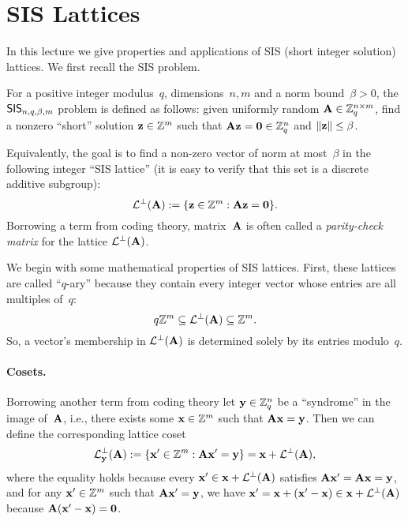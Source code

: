 \documentclass[11pt]{article}
\begin{document}
\thispagestyle{fancy} %


\section{SIS Lattices}
\label{sec:sis-lat}

In this lecture we give properties and applications of SIS (short
integer solution) lattices. We first recall the SIS problem.

\begin{definition}
  \label{def:sis-problem}
  For a positive integer modulus~$q$, dimensions~$n,m$ and a norm
  bound~$\beta > 0$, the $\mathsf{SIS}_{n,q,\beta,m}$ problem is defined as
  follows: given uniformly random $\mathbf{A} \in \mathbb{Z}_q^{n \times m}$, find a
  nonzero ``short'' solution $\mathbf{z} \in \mathbb{Z}^{m}$ such that
  $\mathbf{A} \mathbf{z} = \mathbf{0} \in \mathbb{Z}_q^{n}$ and
  $\lVert\mathbf{z}\rVert \leq \beta$.

  Equivalently, the goal is to find a non-zero vector of norm at
  most~$\beta$ in the following integer ``SIS lattice'' (it is easy to
  verify that this set is a discrete additive subgroup):
  \[ \mathcal{L}^{\perp}(\mathbf{A}) := \{\mathbf{z} \in \mathbb{Z}^{m} : \mathbf{A}\mathbf{z} = \mathbf{0}\}
    . \] Borrowing a term from coding theory, matrix~$\mathbf{A}$ is often
  called a \emph{parity-check matrix} for the lattice
  $\mathcal{L}^{\perp}(\mathbf{A})$.
\end{definition}

We begin with some mathematical properties of SIS lattices. First,
these lattices are called ``$q$-ary'' because they contain every
integer vector whose entries are all multiples of~$q$:
\[
  q\mathbb{Z}^{m} \subseteq \mathcal{L}^{\perp}(\mathbf{A}) \subseteq \mathbb{Z}^{m}.
\]
So, a vector's membership in $\mathcal{L}^{\perp}(\mathbf{A})$ is determined solely by
its entries modulo~$q$.

\paragraph{Cosets.}

Borrowing another term from coding theory let $\mathbf{y} \in \mathbb{Z}_q^{n}$ be a
``syndrome'' in the image of~$\mathbf{A}$, i.e., there exists some
$\mathbf{x} \in \mathbb{Z}^{m}$ such that $\mathbf{A} \mathbf{x} = \mathbf{y}$. Then we can define
the corresponding lattice coset
\[
  \mathcal{L}^{\perp}_{\mathbf{y}}(\mathbf{A}) := \{ \mathbf{x}' \in \mathbb{Z}^m : \mathbf{A} \mathbf{x}' =
    \mathbf{y} \} = \mathbf{x} + \mathcal{L}^{\perp}(\mathbf{A}) , \] where the equality holds
because every $\mathbf{x}' \in \mathbf{x} + \mathcal{L}^{\perp}(\mathbf{A})$ satisfies
$\mathbf{A} \mathbf{x}' = \mathbf{A} \mathbf{x} = \mathbf{y}$, and for any $\mathbf{x}' \in \mathbb{Z}^{m}$
such that $\mathbf{A} \mathbf{x}' = \mathbf{y}$, we have
$\mathbf{x}' = \mathbf{x} + (\mathbf{x}' - \mathbf{x}) \in \mathbf{x} + \mathcal{L}^{\perp}(\mathbf{A})$
because $\mathbf{A} (\mathbf{x}'-\mathbf{x}) = \mathbf{0}$.
\end{document}

